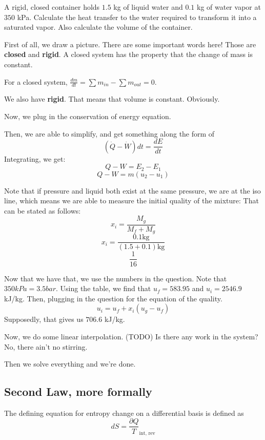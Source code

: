 \documentclass{article}
\begin{document}
\begin{proposition}[Question 1]
  A rigid, closed container holds $1.5$ kg of liquid water and $0.1$ kg of water vapor at $350$ kPa.
Calculate the heat transfer to the water required to transform it into a saturated vapor. Also
calculate the volume of the container.  
\end{proposition}
First of all, we draw a picture. 
There are some important words here! Those are \textbf{closed} and \textbf{rigid}.
A closed system has the property that the change of mass is constant. 
\begin{definition}
    For a closed system, $\frac{dm}{dt} = \sum m_{in} - \sum m_{out} = 0$.
\end{definition}

We also have \textbf{rigid}. That means that volume is constant. Obviously.

Now, we plug in the conservation of energy equation.

Then, we are able to simplify, and get something along the form of 
\[(\dot Q - \dot W)dt = \frac{dE}{dt}\]
Integrating, we get:
\[Q - W = E_2 - E_1\]
\[Q - W = m(u_2 - u_1)\]


Note that if pressure and liquid both exist at the same pressure, we are at the iso line, which means we are able to measure the initial quality of the mixture: That can be stated as follows:
\[x_i = \frac{M_g}{M_f + M_g}\]
\[x_i = \frac{0.1 \text{kg}}{(1.5 + 0.1)\text{kg}}\]
\[\frac{1}{16}\]

Now that we have that, we use the numbers in the question. Note that $350 kPa = 3.5 bar$. Using the table, we find that $u_f = 583.95$ and $u_i = 2546.9$ kJ/kg. Then, plugging in the question for the equation of the quality.
\[u_i = u_f + x_i(u_g - u_f)\]
Supposedly, that gives us $706.6$ kJ/kg. 

Now, we do some linear interpolation.
(TODO)
Is there any work in the system?
No, there ain't no stirring.

Then we solve everything and we're done. 



\subsection{Second Law, more formally}
\begin{definition}
The defining equation for entropy change on a differential basis is defined as 
\[dS = \frac{\partial Q}{T}_\text{int, rev}\]  
\end{definition}
\end{document}

